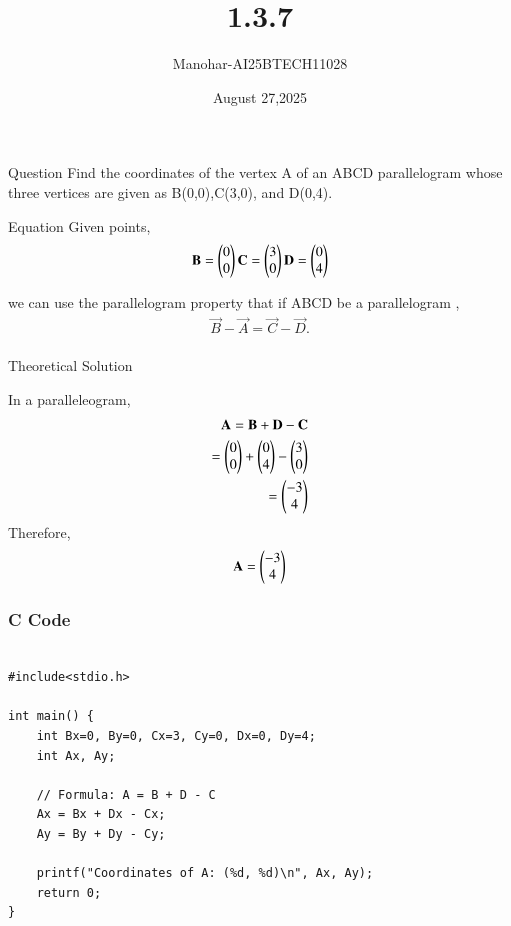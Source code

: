 \documentclass{beamer}
\title 
{1.3.7}
\date{August 27,2025}
\author 
{Manohar-AI25BTECH11028}
\begin{document}
\frame{\titlepage}
\begin{frame}{Question}
Find the coordinates of the  vertex A of an ABCD parallelogram whose three vertices are given as B(0,0),C(3,0), and D(0,4).
\end{frame}





\begin{frame}{Equation}
Given points,
\begin{align}
    \vec{B}=\begin{myvec}{0\\0}\end{myvec}
    \vec{C}=\begin{myvec}{3\\0}\end{myvec} \vec{D}=\begin{myvec}{0\\4}\end{myvec}
\end{align}

we can use the parallelogram property that if ABCD be a parallelogram ,
\begin{align}
\vec{B}-\vec{A}=\vec{C}-\vec{D
}.\\
\end{align}
\end{frame}
\begin{frame}{Theoretical Solution}

In a paralleleogram,
\begin{align}
\mathbf{A} = \mathbf{B} + \mathbf{D} - \mathbf{C}\\
        = \begin{pmatrix}0\\0\end{pmatrix} + \begin{pmatrix}0\\4\end{pmatrix} - \begin{pmatrix}3\\0\end{pmatrix}\\
= \begin{pmatrix}-3\\4\end{pmatrix}
\end{align}
Therefore,
\begin{align}
    \mathbf{A}=\begin{pmatrix}-3\\4\end{pmatrix}
\end{align}

\end{frame}


\begin{frame}[fragile]
    \frametitle{C Code}

    \begin{lstlisting}

#include<stdio.h>

int main() {
    int Bx=0, By=0, Cx=3, Cy=0, Dx=0, Dy=4;
    int Ax, Ay;

    // Formula: A = B + D - C
    Ax = Bx + Dx - Cx;
    Ay = By + Dy - Cy;

    printf("Coordinates of A: (%d, %d)\n", Ax, Ay);
    return 0;
}

    \end{lstlisting}
\end{frame}
\end{document}
